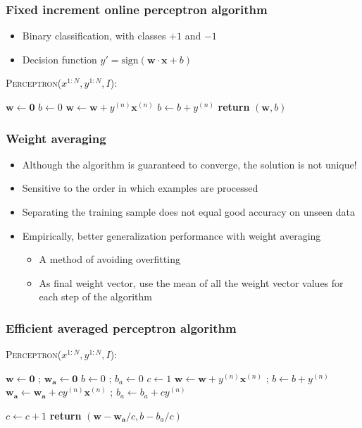 \documentclass[14pt,mathserif]{beamer}
\newcommand{\vecb}[1]{\mathbf{#1}}
\newcommand{\x}{\mathbf{x}}
\begin{document}
\begin{frame}
 \frametitle{Fixed increment online perceptron algorithm}
\begin{itemize}
\item Binary classification, with classes $+1$ and $-1$
\item Decision function $y' = \mathrm{sign}(\vecb{w}\cdot \x+b)$
\end{itemize}

\begin{block}{\textsc{Perceptron}($x^{1:N},y^{1:N},I$):}
\begin{algorithmic}[1]
\STATE $\vecb{w} \leftarrow \vecb{0}$
\STATE $b \leftarrow 0$
    		\IF {$y^{(n)} (\vecb{w}\cdot \x^{(n)}+b) \leq 0$}
        		\STATE $\vecb{w} \leftarrow \vecb{w} + y^{(n)} \x^{(n)}$
			\STATE $b \leftarrow b + y^{(n)}$
    		\ENDIF
    	\ENDFOR
\ENDFOR
\STATE \textbf{return} $(\vecb{w},b)$
\end{algorithmic}                 \end{block}
\end{frame}


\begin{frame}
 \frametitle{Weight averaging}
\begin{itemize}
 \item Although the algorithm is guaranteed to converge, the solution is not unique!
\item Sensitive to the order in which examples are processed
\item Separating the training sample does not equal good accuracy on unseen data
\item Empirically, better generalization performance with \alert{weight averaging}
\begin{itemize}
\item A method of avoiding overfitting
\item As final weight vector, use the mean of all the weight vector values for each step of the algorithm
\end{itemize}
\end{itemize}
\end{frame}

\begin{frame}
\frametitle{Efficient averaged perceptron algorithm}
 \begin{block}{\textsc{Perceptron}($x^{1:N},y^{1:N},I$):}
\begin{algorithmic}[1]
\STATE $\vecb{w} \leftarrow \vecb{0}$ ; $\vecb{w_a} \leftarrow \vecb{0}$
\STATE $b \leftarrow 0$ ; $b_a \leftarrow 0$
\STATE $c \leftarrow 1$
    		\IF {$y^{(n)} (\vecb{w}\cdot \x^{(n)}+b) \leq 0$}
        		\STATE $\vecb{w} \leftarrow \vecb{w} + y^{(n)} \x^{(n)}$ ; $b \leftarrow b + y^{(n)}$
			\STATE $\vecb{w_a} \leftarrow \vecb{w_a} + c y^{(n)} \x^{(n)}$ ; $b_a \leftarrow b_a + c y^{(n)}$

    		\ENDIF
        \STATE $c \leftarrow c + 1$
    	\ENDFOR
\ENDFOR
\STATE \textbf{return} $(\vecb{w}-\vecb{w_a}/c, b - b_a/c)$
\end{algorithmic}                 \end{block}
\end{frame}
\end{document}
